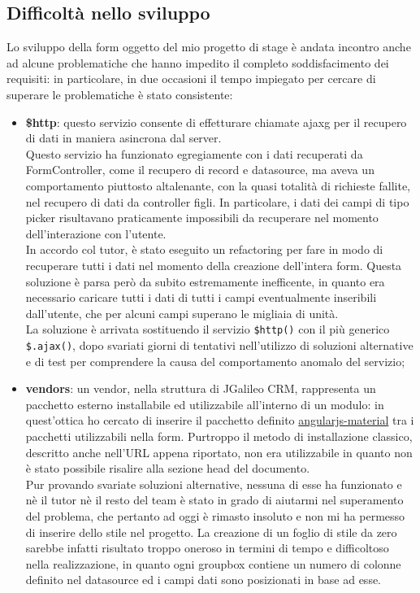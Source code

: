 \subsection{Difficoltà nello sviluppo}
Lo sviluppo della form oggetto del mio progetto di stage è andata incontro anche ad alcune problematiche che hanno impedito il completo soddisfacimento dei requisiti: in particolare, in due occasioni il tempo impiegato per cercare di superare le problematiche è stato consistente:
\begin{itemize}
	\item \textbf{\$http}: questo servizio consente di effetturare chiamate \gls{ajaxg} per il recupero di dati in maniera asincrona dal server.\\
	Questo servizio ha funzionato egregiamente con i dati recuperati da FormController, come il recupero di record e datasource, ma aveva un comportamento piuttosto altalenante, con la quasi totalità di richieste fallite, nel recupero di dati da controller figli. In particolare, i dati dei campi di tipo picker risultavano praticamente impossibili da recuperare nel momento dell'interazione con l'utente.\\
	In accordo col tutor, è stato eseguito un refactoring per fare in modo di recuperare tutti i dati nel momento della creazione dell'intera form. Questa soluzione è parsa però da subito estremamente inefficente, in quanto era necessario caricare tutti i dati di tutti i campi eventualmente inseribili dall'utente, che per alcuni campi superano le migliaia di unità. \\
	La soluzione è arrivata sostituendo il servizio \lstinline[language=HTML]!$http()! con il più generico \lstinline[language=HTML]!$.ajax()!, dopo svariati giorni di tentativi nell'utilizzo di soluzioni alternative e di test per comprendere la causa del comportamento anomalo del servizio;
	\item \textbf{vendors}: un vendor, nella struttura di JGalileo CRM, rappresenta un pacchetto esterno installabile ed utilizzabile all'interno di un modulo: in quest'ottica ho cercato di inserire il pacchetto definito \href{https://github.com/angular/material}{angularjs-material} tra i pacchetti utilizzabili nella form. Purtroppo il metodo di installazione classico, descritto anche nell'URL appena riportato, non era utilizzabile in quanto non è stato possibile risalire alla sezione head del documento.\\ Pur provando svariate soluzioni alternative, nessuna di esse ha funzionato e nè il tutor nè il resto del team è stato in grado di aiutarmi nel superamento del problema, che pertanto ad oggi è rimasto insoluto e non mi ha permesso di inserire dello stile nel progetto. La creazione di un foglio di stile da zero sarebbe infatti risultato troppo oneroso in termini di tempo e difficoltoso nella realizzazione, in quanto ogni groupbox contiene un numero di colonne definito nel datasource ed i campi dati sono posizionati in base ad esse.
\end{itemize}
\newpage
